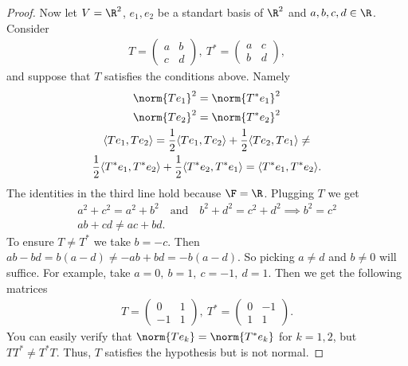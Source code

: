 \documentclass{extarticle}
\begin{document}
\begin{proof}
    Now let \(V = \R^2\), \(e_1, e_2\) be a standart basis of \( \R^2 \) and
    \( a,  b,  c,  d \in \R \). Consider
    \begin{align*}
        T =
        \begin{pmatrix}
            a & b \\
            c & d
        \end{pmatrix}, \
        T^* =
        \begin{pmatrix}
            a & c \\
            b & d
        \end{pmatrix},
    \end{align*}
    and suppose that \( T \) satisfies the conditions above.
    Namely
    \begin{gather*}
        \norm{T e_1}^2 = \norm{T^* e_1}^2 \\
        \norm{T e_2}^2 = \norm{T^* e_2}^2 \\
        \langle T e_1, T e_2 \rangle =
        \frac{1}{2}\langle T e_1, T e_2 \rangle + \frac{1}{2}\langle T e_2, T e_1 \rangle
        \ne \\
        \frac{1}{2}\langle T^* e_1, T^* e_2 \rangle + \frac{1}{2}\langle T^* e_2, T^* e_1 \rangle =
        \langle T^* e_1, T^* e_2 \rangle.
    \end{gather*}
    The identities in the third line hold because \( \F=\R \).
    Plugging \( T \) we get
    \begin{gather*}
        a^2 + c^2 = a^2 + b^2 \quad \text{and} \quad  b^2 + d^2 = c^2 + d^2
        \implies b^2 = c^2 \\
        ab + cd \ne ac + bd.
    \end{gather*}
    To ensure \(T \ne T^*\) we take \( b = -c \).
    Then \( ab - bd = b(a-d) \ne -ab + bd = -b(a-d) \). So picking \( a \ne d \) and \( b \ne 0\)
    will suffice.
    For example, take \( a = 0, \ b = 1, \ c = -1, \ d = 1 \). Then we get the following
    matrices
    \begin{align*}
        T =
        \begin{pmatrix}
            0 & 1 \\
            -1 & 1
        \end{pmatrix}, \
        T^* =
        \begin{pmatrix}
            0 & -1 \\
            1 & 1
        \end{pmatrix}.
    \end{align*}
    You can easily verify that \(\norm{T e_k} = \norm{T^* e_k}\) for \( k=1, 2 \), but
    $ T T^* \ne T^* T$.
    Thus, \( T \) satisfies the hypothesis but is not normal.
\end{proof}
\end{document}
